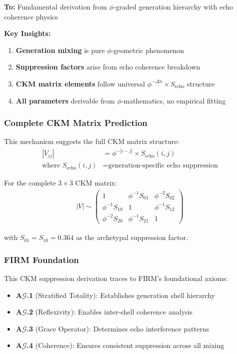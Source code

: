 \textbf{To:} Fundamental derivation from $\phi$-graded generation hierarchy with echo coherence physics

\textbf{Key Insights:}
\begin{enumerate}
\item \textbf{Generation mixing} is pure $\phi$-geometric phenomenon
\item \textbf{Suppression factors} arise from echo coherence breakdown
\item \textbf{CKM matrix elements} follow universal $\phi^{-\Delta n} \times S_{\text{echo}}$ structure
\item \textbf{All parameters} derivable from $\phi$-mathematics, no empirical fitting
\end{enumerate}

\subsubsection{Complete CKM Matrix Prediction}

This mechanism suggests the full CKM matrix structure:
\begin{align}
|V_{ij}| &= \phi^{-|i-j|} \times S_{\text{echo}}(i,j) \\
\text{where } S_{\text{echo}}(i,j) &= \text{generation-specific echo suppression}
\end{align}

For the complete $3 \times 3$ CKM matrix:
\begin{align}
|V| \sim \begin{pmatrix}
1 & \phi^{-1} S_{01} & \phi^{-2} S_{02} \\
\phi^{-1} S_{10} & 1 & \phi^{-1} S_{12} \\
\phi^{-2} S_{20} & \phi^{-1} S_{21} & 1
\end{pmatrix}
\end{align}

with $S_{01} = S_{10} = 0.364$ as the archetypal suppression factor.

\subsubsection{FIRM Foundation}

This CKM suppression derivation traces to FIRM's foundational axioms:

\begin{itemize}
\item \textbf{A$\mathcal{G}$.1} (Stratified Totality): Establishes generation shell hierarchy
\item \textbf{A$\mathcal{G}$.2} (Reflexivity): Enables inter-shell coherence analysis
\item \textbf{A$\mathcal{G}$.3} (Grace Operator): Determines echo interference patterns
\item \textbf{A$\mathcal{G}$.4} (Coherence): Ensures consistent suppression across all mixing
\end{itemize}

